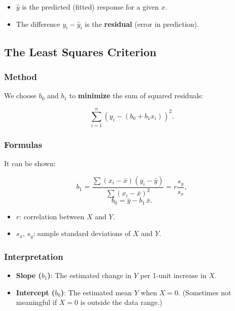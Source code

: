 \documentclass[10pt, total={6in, 8in}]{extarticle}
\begin{document}
\begin{itemize}
    \item $\hat{y}$ is the predicted (fitted) response for a given $x$.
    \item The difference $y_i - \hat{y}_i$ is the \textbf{residual} (error in prediction).
\end{itemize}



\subsection{The Least Squares Criterion}

\subsubsection{Method}

We choose $b_0$ and $b_1$ to \textbf{minimize} the sum of squared residuals:

\[
    \sum_{i=1}^n \left(y_i - \left(b_0 + b_1 x_i\right)\right)^2.
\]

\subsubsection{Formulas}

It can be shown:

\[
    b_1 = \frac{\sum (x_i - \bar{x})(y_i - \bar{y})}{\sum (x_i - \bar{x})^2}
    = r \frac{s_y}{s_x},
\]
\[
    b_0 = \bar{y} - b_1\,\bar{x}.
\]

\begin{itemize}
    \item $r$: correlation between $X$ and $Y$.
    \item $s_x$, $s_y$: sample standard deviations of $X$ and $Y$.
\end{itemize}

\subsubsection{Interpretation}

\begin{itemize}
    \item \textbf{Slope ($b_1$)}: The estimated change in $Y$ per 1-unit increase in $X$.
    \item \textbf{Intercept ($b_0$)}: The estimated mean $Y$ when $X=0$. (Sometimes not meaningful if $X=0$ is outside the data range.)
\end{itemize}
\end{document}
